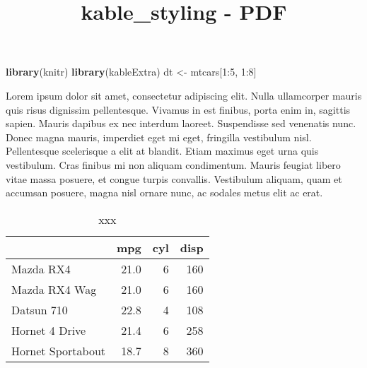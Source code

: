 \documentclass[]{article}
\title{kable\_styling - PDF}
\author{}
\date{}
\newenvironment{Shaded}{\begin{snugshade}}{\end{snugshade}}
\newcommand{\KeywordTok}[1]{\textcolor[rgb]{0.13,0.29,0.53}{\textbf{{#1}}}}
\newcommand{\DataTypeTok}[1]{\textcolor[rgb]{0.13,0.29,0.53}{{#1}}}
\newcommand{\DecValTok}[1]{\textcolor[rgb]{0.00,0.00,0.81}{{#1}}}
\newcommand{\StringTok}[1]{\textcolor[rgb]{0.31,0.60,0.02}{{#1}}}
\newcommand{\NormalTok}[1]{{#1}}
\begin{document}
\maketitle

\begin{Shaded}
\begin{Highlighting}[]
\KeywordTok{library}\NormalTok{(knitr)}
\KeywordTok{library}\NormalTok{(kableExtra)}
\NormalTok{dt <-}\StringTok{ }\NormalTok{mtcars[}\DecValTok{1}\NormalTok{:}\DecValTok{5}\NormalTok{, }\DecValTok{1}\NormalTok{:}\DecValTok{8}\NormalTok{]}
\end{Highlighting}
\end{Shaded}

Lorem ipsum dolor sit amet, consectetur adipiscing elit. Nulla
ullamcorper mauris quis risus dignissim pellentesque. Vivamus in est
finibus, porta enim in, sagittis sapien. Mauris dapibus ex nec interdum
laoreet. Suspendisse sed venenatis nunc. Donec magna mauris, imperdiet
eget mi eget, fringilla vestibulum nisl. Pellentesque scelerisque a elit
at blandit. Etiam maximus eget urna quis vestibulum. Cras finibus mi non
aliquam condimentum. Mauris feugiat libero vitae massa posuere, et
congue turpis convallis. Vestibulum aliquam, quam et accumsan posuere,
magna nisl ornare nunc, ac sodales metus elit ac erat.

\begin{Shaded}
\end{Shaded}


\begin{wraptable}{l}{6.6cm}

\caption{\label{tab:unnamed-chunk-2}xxx}
\centering
\fontsize{6}{8}\selectfont
\begin{tabular}[t]{lrrr}
\toprule
  & mpg & cyl & disp\\
\midrule
Mazda RX4 & 21.0 & 6 & 160\\
Mazda RX4 Wag & 21.0 & 6 & 160\\
Datsun 710 & 22.8 & 4 & 108\\
Hornet 4 Drive & 21.4 & 6 & 258\\
Hornet Sportabout & 18.7 & 8 & 360\\
\bottomrule
\end{tabular}
\end{wraptable}
\end{document}
